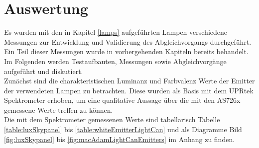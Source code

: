 \documentclass[11pt]{scrartcl}
\begin{document}
\section{Auswertung}
Es wurden mit den in Kapitel \ref{lamps} aufgeführten Lampen verschiedene Messungen zur Entwicklung und Validierung des Abgleichvorgangs durchgeführt.\\
Ein Teil dieser Messungen wurde in vorhergehenden Kapiteln bereits behandelt. Im Folgenden werden Testaufbauten, Messungen sowie Abgleichvorgänge aufgeführt
und diskutiert.\\
Zunächst sind die charakteristischen Luminanz und Farbvalenz Werte der Emitter der verwendeten Lampen zu betrachten. Diese wurden als Basis mit dem UPRtek
Spektrometer erhoben, um eine qualitative Aussage über die mit den AS726x gemessene Werte treffen zu können.\\
Die mit dem Spektrometer gemessenen Werte sind tabellarisch Tabelle \ref{table:luxSkypanel} bis \ref{table:whiteEmitterLightCan} und als Diagramme Bild
\ref{fig:luxSkypanel} bis \ref{fig:macAdamLightCanEmitters} im Anhang zu finden.
\end{document}
